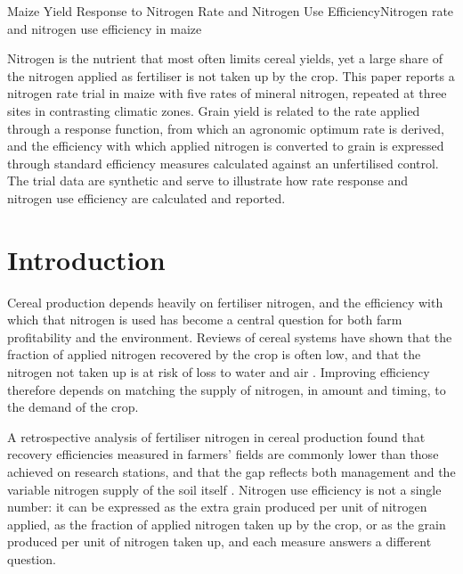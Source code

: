 \documentclass[../main.tex]{subfiles}
\begin{document}
\begin{paper}{Maize Yield Response to Nitrogen Rate and Nitrogen Use Efficiency}{Nitrogen rate and nitrogen use efficiency in maize}
\label{paper:nitrogen}

\begin{paperabstract}
Nitrogen is the nutrient that most often limits cereal yields, yet a large
share of the nitrogen applied as fertiliser is not taken up by the crop. This
paper reports a nitrogen rate trial in maize with five rates of mineral
nitrogen, repeated at three sites in contrasting climatic zones. Grain yield
is related to the rate applied through a response function, from which an
agronomic optimum rate is derived, and the efficiency with which applied
nitrogen is converted to grain is expressed through standard efficiency
measures calculated against an unfertilised control. The trial data are
synthetic and serve to illustrate how rate response and nitrogen use
efficiency are calculated and reported.
\end{paperabstract}

\section{Introduction}

Cereal production depends heavily on fertiliser nitrogen, and the efficiency
with which that nitrogen is used has become a central question for both
farm profitability and the environment. Reviews of cereal systems have shown
that the fraction of applied nitrogen recovered by the crop is often low, and
that the nitrogen not taken up is at risk of loss to water and air
\parencite{cassman2002}. Improving efficiency therefore depends on matching
the supply of nitrogen, in amount and timing, to the demand of the crop.

A retrospective analysis of fertiliser nitrogen in cereal production found
that recovery efficiencies measured in farmers' fields are commonly lower than
those achieved on research stations, and that the gap reflects both
management and the variable nitrogen supply of the soil itself
\parencite{ladha2005}. Nitrogen use efficiency is not a single number: it can
be expressed as the extra grain produced per unit of nitrogen applied, as the
fraction of applied nitrogen taken up by the crop, or as the grain produced
per unit of nitrogen taken up, and each measure answers a different question.


\end{paper}
\end{document}
